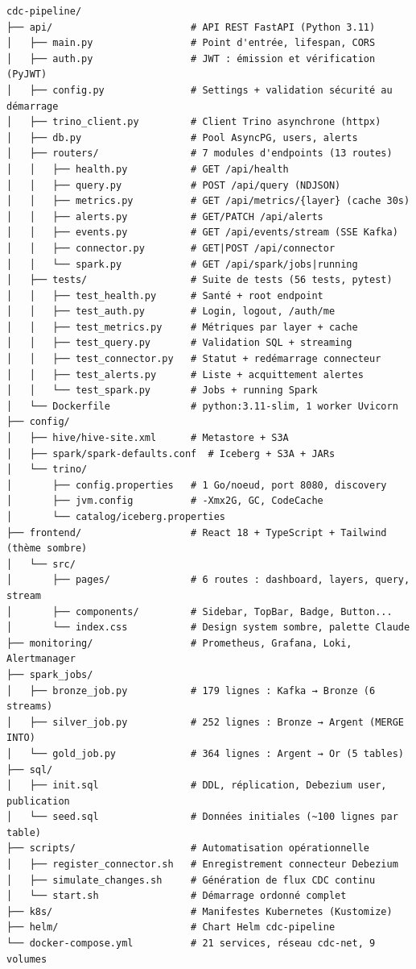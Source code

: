 \documentclass[12pt,a4paper]{report}
\begin{document}
\begin{lstlisting}[caption={Structure du dépôt cdc-pipeline-bigdata}]
cdc-pipeline/
├── api/                        # API REST FastAPI (Python 3.11)
│   ├── main.py                 # Point d'entrée, lifespan, CORS
│   ├── auth.py                 # JWT : émission et vérification (PyJWT)
│   ├── config.py               # Settings + validation sécurité au démarrage
│   ├── trino_client.py         # Client Trino asynchrone (httpx)
│   ├── db.py                   # Pool AsyncPG, users, alerts
│   ├── routers/                # 7 modules d'endpoints (13 routes)
│   │   ├── health.py           # GET /api/health
│   │   ├── query.py            # POST /api/query (NDJSON)
│   │   ├── metrics.py          # GET /api/metrics/{layer} (cache 30s)
│   │   ├── alerts.py           # GET/PATCH /api/alerts
│   │   ├── events.py           # GET /api/events/stream (SSE Kafka)
│   │   ├── connector.py        # GET|POST /api/connector
│   │   └── spark.py            # GET /api/spark/jobs|running
│   ├── tests/                  # Suite de tests (56 tests, pytest)
│   │   ├── test_health.py      # Santé + root endpoint
│   │   ├── test_auth.py        # Login, logout, /auth/me
│   │   ├── test_metrics.py     # Métriques par layer + cache
│   │   ├── test_query.py       # Validation SQL + streaming
│   │   ├── test_connector.py   # Statut + redémarrage connecteur
│   │   ├── test_alerts.py      # Liste + acquittement alertes
│   │   └── test_spark.py       # Jobs + running Spark
│   └── Dockerfile              # python:3.11-slim, 1 worker Uvicorn
├── config/
│   ├── hive/hive-site.xml      # Metastore + S3A
│   ├── spark/spark-defaults.conf  # Iceberg + S3A + JARs
│   └── trino/
│       ├── config.properties   # 1 Go/noeud, port 8080, discovery
│       ├── jvm.config          # -Xmx2G, GC, CodeCache
│       └── catalog/iceberg.properties
├── frontend/                   # React 18 + TypeScript + Tailwind (thème sombre)
│   └── src/
│       ├── pages/              # 6 routes : dashboard, layers, query, stream
│       ├── components/         # Sidebar, TopBar, Badge, Button...
│       └── index.css           # Design system sombre, palette Claude
├── monitoring/                 # Prometheus, Grafana, Loki, Alertmanager
├── spark_jobs/
│   ├── bronze_job.py           # 179 lignes : Kafka → Bronze (6 streams)
│   ├── silver_job.py           # 252 lignes : Bronze → Argent (MERGE INTO)
│   └── gold_job.py             # 364 lignes : Argent → Or (5 tables)
├── sql/
│   ├── init.sql                # DDL, réplication, Debezium user, publication
│   └── seed.sql                # Données initiales (~100 lignes par table)
├── scripts/                    # Automatisation opérationnelle
│   ├── register_connector.sh   # Enregistrement connecteur Debezium
│   ├── simulate_changes.sh     # Génération de flux CDC continu
│   └── start.sh                # Démarrage ordonné complet
├── k8s/                        # Manifestes Kubernetes (Kustomize)
├── helm/                       # Chart Helm cdc-pipeline
└── docker-compose.yml          # 21 services, réseau cdc-net, 9 volumes
\end{lstlisting}
\end{document}
